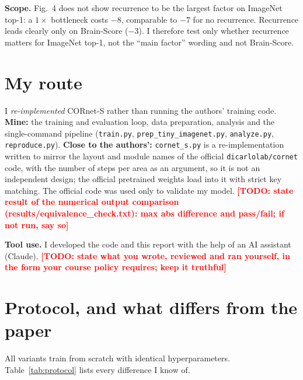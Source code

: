 \documentclass[conference]{IEEEtran}
\newcommand{\todo}[1]{\textcolor{red}{\textbf{[TODO: #1]}}}
\begin{document}
\textbf{Scope.} Fig.~4 does not show recurrence to be the largest factor on ImageNet top-1: a $1\times$ bottleneck costs $-8$, comparable to $-7$ for no recurrence. Recurrence leads clearly only on Brain-Score ($-3$). I therefore test only whether recurrence matters for ImageNet top-1, not the ``main factor'' wording and not Brain-Score.

\section{My route}
I \emph{re-implemented} CORnet-S rather than running the authors' training code. \textbf{Mine:} the training and evaluation loop, data preparation, analysis and the single-command pipeline (\texttt{train.py}, \texttt{prep\_tiny\_imagenet.py}, \texttt{analyze.py}, \texttt{reproduce.py}). \textbf{Close to the authors':} \texttt{cornet\_s.py} is a re-implementation written to mirror the layout and module names of the official \texttt{dicarlolab/cornet} code, with the number of steps per area as an argument, so it is not an independent design; the official pretrained weights load into it with strict key matching. The official code was used only to validate my model. \todo{state result of the numerical output comparison (results/equivalence\_check.txt): max abs difference and pass/fail; if not run, say so}

\textbf{Tool use.} I developed the code and this report with the help of an AI assistant (Claude). \todo{state what you wrote, reviewed and ran yourself, in the form your course policy requires; keep it truthful}

\section{Protocol, and what differs from the paper}
All variants train from scratch with identical hyperparameters. Table~\ref{tab:protocol} lists every difference I know of.
\end{document}
